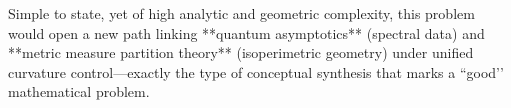 Simple to state, yet of high analytic and geometric complexity, this problem would open a new path linking **quantum asymptotics** (spectral data) and **metric measure partition theory** (isoperimetric geometry) under unified curvature control—exactly the type of conceptual synthesis that marks a “good’’ mathematical problem.